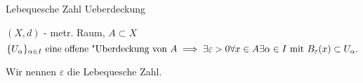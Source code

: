 \documentclass[class=article, crop=false]{standalone}
\begin{document}
\begin{zettel}{Lebequesche Zahl Ueberdeckung}
\begin{flashcard}
    $(X,d)$ - metr. Raum, $A \subset X$ 
\[
    \set{ U_{\alpha}  }_{\alpha \in  I} \text{ eine offene "Uberdeckung von } A \implies \exists \varepsilon > 0 \forall x \in  A \exists \alpha \in  I \text{ mit } B_{\varepsilon } (x) \subset U_{\alpha } 
.\]

Wir nennen $\varepsilon $ die Lebequesche Zahl.

\end{flashcard}
\end{zettel}
\end{document}
